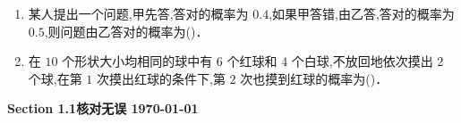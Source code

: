 \begin{enumerate}
  \item  某人提出一个问题,甲先答,答对的概率为 $0.4$,如果甲答错,由乙答,答对的概率为 $0.5$,则问题由乙答对的概率为(\quad)．

  \item  在 $10$ 个形状大小均相同的球中有 $6$ 个红球和 $4$ 个白球,不放回地依次摸出 $2$ 个球,在第 $1$ 次摸出红球的条件下,第 $2$ 次也摸到红球的概率为(\quad)．
\end{enumerate}

\begin{center}
    \color{red}
    \textbf{Section 1.1核对无误 \today}
\end{center}